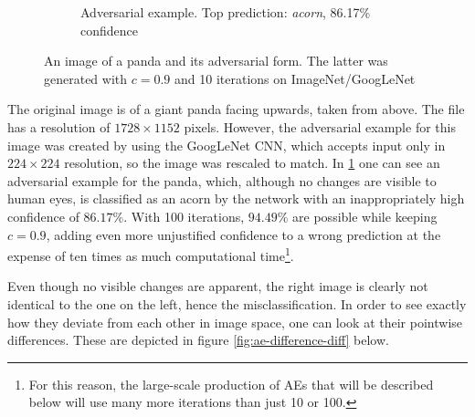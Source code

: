 \documentclass[11pt, a4paper]{article}
\begin{document}
\begin{figure}[h!tb]
\begin{subfigure}[b]{0.45\textwidth}
        \caption{Adversarial example. Top prediction: \emph{acorn}, 86.17\% confidence \\}
        \label{fig:ae-example-ae}
    \end{subfigure}
    \caption[Adversarial example of a panda as an acorn, generated with iterative FGSM]{An image of a panda and its adversarial form. The latter was generated with $c = 0.9$ and 10 iterations on ImageNet/GoogLeNet}
    \label{fig:ae-example}
\end{figure}

The original image is of a giant panda facing upwards, taken from above. The file has a resolution of $1728 \times 1152$ pixels. However, the adversarial example for this image was created by using the GoogLeNet CNN, which accepts input only in $224 \times 224$ resolution, so the image was rescaled to match. In \ref{fig:ae-example-ae} one can see an adversarial example for the panda, which, although no changes are visible to human eyes, is classified as an acorn by the network with an inappropriately high confidence of $86.17\%$. With 100 iterations, $94.49\%$ are possible while keeping $c = 0.9$, adding even more unjustified confidence to a wrong prediction at the expense of ten times as much computational time\footnote{For this reason, the large-scale production of AEs that will be described below will use many more iterations than just 10 or 100.}.

Even though no visible changes are apparent, the right image is clearly not identical to the one on the left, hence the misclassification. In order to see exactly how they deviate from each other in image space, one can look at their pointwise differences. These are depicted in figure \ref{fig:ae-difference-diff} below.
\end{document}
